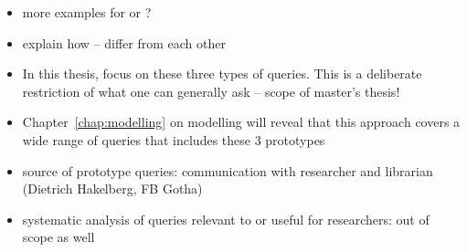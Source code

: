 %
\begin{itemize}
  \item
    more examples for  or ?
  \item
    explain how -- differ from each other
  \item
    In this thesis, focus on these three types of queries.
    This is a deliberate restriction of what one can generally ask – scope of master's thesis!
  \item
    Chapter~\ref{chap:modelling} on modelling will reveal that this approach covers a wide range of queries
    that includes these 3 prototypes
  \item
    source of prototype queries: communication with researcher and librarian (Dietrich Hakelberg, FB Gotha)
  \item
    systematic analysis of queries relevant to or useful for researchers: out of scope as well
\end{itemize}
